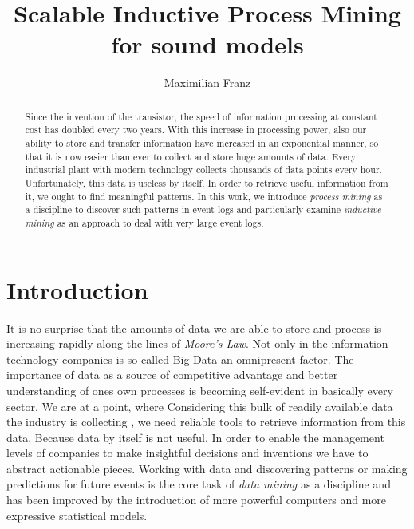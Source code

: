\documentclass[a4paper]{IEEEtran}
\title{Scalable Inductive Process Mining for sound models}
\author{Maximilian Franz}
\begin{document}
\theoremstyle{plain}
\newtheorem{thm}{Theorem}[] %

\theoremstyle{definition}
\newtheorem{defn}[thm]{Definition} %
\newtheorem{exmp}[thm]{Example} %


\maketitle

\begin{abstract}
Since the invention of the transistor, the speed of information processing at constant cost has doubled every two years. With this increase in processing power, also our ability to store and transfer information have increased in an exponential manner, so that it is now easier than ever to collect and store huge amounts of data. Every industrial plant with modern technology collects thousands of data points every hour. Unfortunately, this data is useless by itself. In order to retrieve useful information from it, we ought to find meaningful patterns.
In this work, we introduce \textit{process mining} as a discipline to discover such patterns in event logs and particularly examine \textit{inductive mining} as an approach to deal with very large event logs. 
\end{abstract}

\section{Introduction}
It is no surprise that the amounts of data we are able to store and process is increasing rapidly along the lines of \textit{Moore's Law}. Not only in the information technology companies is so called Big Data an omnipresent factor. The importance of data as a source of competitive advantage and better understanding of ones own processes is becoming self-evident in basically every sector. We are at a point, where  \cite{manyika2011bigdata}
Considering this bulk of readily available data the industry is collecting \cite{hilbert2011worldcapacity}, we need reliable tools to retrieve information from this data. Because data by itself is not useful. In order to enable the management levels of companies to make insightful decisions and inventions we have to abstract actionable pieces. Working with data and discovering patterns or making predictions for future events is the core task of \textit{data mining} as a discipline and has been improved by the introduction of more powerful computers and more expressive statistical models.
\end{document}
